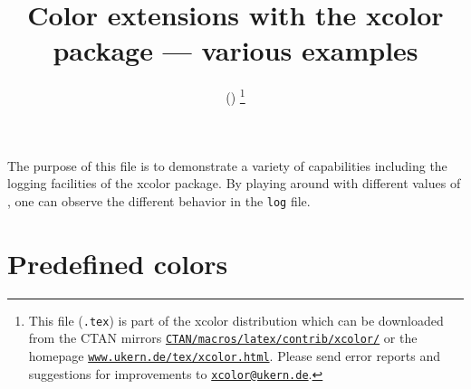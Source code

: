 \documentclass[a4paper]{article}
\begin{document}
\title{Color extensions with the \textsf{xcolor} package --- various examples}
\author{\href{mailto:xcolor@ukern.de}{}}
\date{\XCfileversion{} (\XCfiledate)
\thanks{This file (\texttt{\jobname.tex}) is part of the \textsf{xcolor} distribution which can be downloaded from the CTAN mirrors \texttt{\href{http://www.ctan.org/tex-archive/macros/latex/contrib/xcolor/}{CTAN/macros/latex/contrib/xcolor/}} or the homepage \texttt{\href{http://www.ukern.de/tex/xcolor.html}{www.ukern.de/tex/xcolor.html}}. Please send error reports and suggestions for improvements to \texttt{\href{mailto:xcolor@ukern.de}{xcolor@ukern.de}}.}}
\maketitle

The purpose of this file is to demonstrate a variety of capabilities including the logging facilities of the \textsf{xcolor} package.
By playing around with different values of \texttt{\string\tracingcolors}, one can observe the different behavior in the \texttt{log} file.

\section{Predefined colors}

\begingroup
\small\sffamily
{}
\begin{testcolors}
\noalign{\medskip}\hline\noalign{\medskip}
\noalign{\medskip}\hline\noalign{\medskip}
\noalign{\medskip}\hline\noalign{\medskip}
\end{testcolors}
\endgroup

\vfill

\clearpage
\pagecolor{white}
\end{document}
